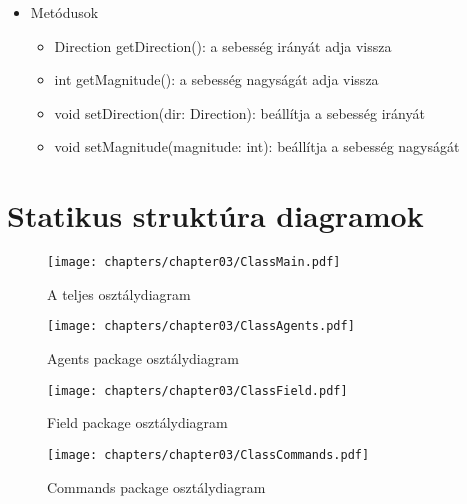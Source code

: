 \begin{itemize}
\begin{itemize}
\begin{itemize}
\end{itemize}

\item Metódusok\\

\begin{itemize}
    \item Direction getDirection(): a sebesség irányát adja vissza
    \item int getMagnitude(): a sebesség nagyságát adja vissza
    \item void setDirection(dir: Direction): beállítja a sebesség irányát
    \item void setMagnitude(magnitude: int): beállítja a sebesség nagyságát
\end{itemize}

\end{itemize}

\clearpage

\section{Statikus struktúra diagramok}

\begin{figure}[h]
\begin{center}
\texttt{[image: chapters/chapter03/ClassMain.pdf]}
\caption{A teljes osztálydiagram}
\label{A teljes osztálydiagram}
\end{center}
\end{figure}

\begin{figure}[h]
\begin{center}
\texttt{[image: chapters/chapter03/ClassAgents.pdf]}
\caption{Agents package osztálydiagram}
\label{Agents package osztálydiagram}
\end{center}
\end{figure}

\begin{figure}[h]
\begin{center}
\texttt{[image: chapters/chapter03/ClassField.pdf]}
\caption{Field package osztálydiagram}
\label{Field package osztálydiagram}
\end{center}
\end{figure}

\clearpage

\begin{figure}[h]
\begin{center}
\texttt{[image: chapters/chapter03/ClassCommands.pdf]}
\caption{Commands package osztálydiagram}
\label{Commands package osztálydiagram}
\end{center}
\end{figure}



\end{itemize}
